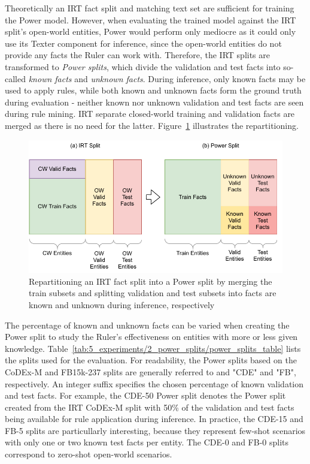 Theoretically an IRT fact split and matching text set are sufficient for training the Power model. However, when evaluating the trained model against the IRT split's open-world entities, Power would perform only mediocre as it could only use its Texter component for inference, since the open-world entities do not provide any facts the Ruler can work with. Therefore, the IRT splits are transformed to \emph{Power splits}, which divide the validation and test facts into so-called \emph{known facts} and \emph{unknown facts}. During inference, only known facts may be used to apply rules, while both known and unknown facts form the ground truth during evaluation - neither known nor unknown validation and test facts are seen during rule mining. IRT separate closed-world training and validation facts are merged as there is no need for the latter. Figure~\ref{fig:5_experiments/2_power_splits/power_split} illustrates the repartitioning.

\begin{figure}[t]
    \centering
    \includegraphics[width=\textwidth]{5_experiments/2_power_splits/power_split}
    \caption{Repartitioning an IRT fact split into a Power split by merging the train subsets and splitting validation and test subsets into facts are known and unknown during inference, respectively}
    \label{fig:5_experiments/2_power_splits/power_split}
\end{figure}

The percentage of known and unknown facts can be varied when creating the Power split to study the Ruler's effectiveness on entities with more or less given knowledge. Table~\ref{tab:5_experiments/2_power_splits/power_splits_table} lists the splits used for the evaluation. For readability, the Power splits based on the CoDEx-M and FB15k-237 splits are generally referred to and "CDE" and "FB", respectively. An integer suffix specifies the chosen percentage of known validation and test facts. For example, the CDE-50 Power split denotes the Power split created from the IRT CoDEx-M split with 50\% of the validation and test facts being available for rule application during inference. In practice, the CDE-15 and FB-5 splits are particullarly interesting, because they represent few-shot scenarios with only one or two known test facts per entity. The CDE-0 and FB-0 splits correspond to zero-shot open-world scenarios.


